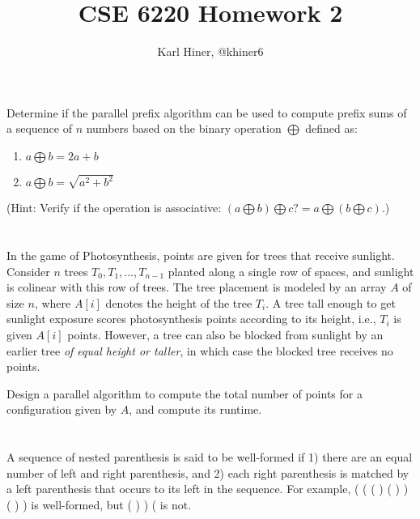 \documentclass[twoside,10pt]{article}
\begin{document}
\title{CSE 6220 Homework 2}
\author{Karl Hiner, @khiner6}
\date{}
\maketitle

\section{}

Determine if the parallel prefix algorithm can be used to compute prefix sums of a sequence of $n$ numbers based on the binary operation $\bigoplus$ defined as:

\begin{enumerate}[label=(\alph*)]
  \item $a \bigoplus b = 2a + b$
  \item $a \bigoplus b = \sqrt{a^2 + b^2}$
\end{enumerate}

(Hint: Verify if the operation is associative: $(a \bigoplus b) \bigoplus c ?= a \bigoplus (b \bigoplus c)$.)

\section{}

In the game of Photosynthesis, points are given for trees that receive sunlight.
Consider $n$ trees $T_0,T_1,...,T_{n-1}$ planted along a single row of spaces, and sunlight is colinear with this row of trees.
The tree placement is modeled by an array $A$ of size $n$, where $A[i]$ denotes the height of the tree $T_i$.
A tree tall enough to get sunlight exposure scores photosynthesis points according to its height, i.e., $T_i$ is given $A[i]$ points.
However, a tree can also be blocked from sunlight by an earlier tree \textit{of equal height or taller}, in which case the blocked tree receives no points.

Design a parallel algorithm to compute the total number of points for a configuration given by $A$, and compute its runtime. 

\section{}

A sequence of nested parenthesis is said to be well-formed if 1) there are an equal number of left and right parenthesis, and 2) each right parenthesis is matched by a left parenthesis that occurs to its left in the sequence.
For example, ( ( ( ) ( ) ) ( ) ) is well-formed, but ( ) ) ( is not.
\end{document}
